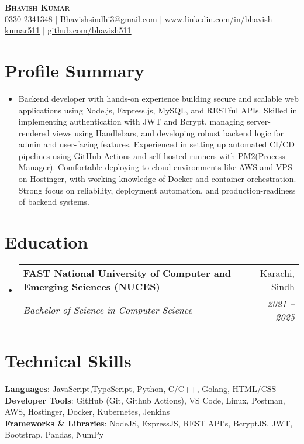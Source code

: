 \documentclass[letterpaper,10.5pt]{article}
\makeatletter
\newcommand{\resumeSubheading}[4]{
  \vspace{-2pt}\item
    \begin{tabular*}{0.97\textwidth}[t]{l@{\extracolsep{\fill}}r}
      \textbf{#1} & #2 \\
      \textit{\small#3} & \textit{\small #4} \\
    \end{tabular*}\vspace{-7pt}
}
\newcommand{\resumeSubHeadingListStart}{\begin{itemize}[leftmargin=0.15in, label={}]} %
\newcommand{\resumeSubHeadingListEnd}{\end{itemize}} %
\makeatother
\begin{document}
\begin{center}
    \textbf{\Huge \scshape Bhavish Kumar} \\ \vspace{1pt}
    \small 0330-2341348 $|$ \href{mailto:Bhavishsindhi3@gmail.com}{\underline{Bhavishsindhi3@gmail.com}} $|$ 
    \href{https://www.linkedin.com/in/bhavish-kumar511}{\underline{www.linkedin.com/in/bhavish-kumar511}} $|$
    \href{https://github.com/bhavish511}{\underline{github.com/bhavish511}}
\end{center}

\section{Profile Summary}
\resumeSubHeadingListStart
\item{
        Backend developer with hands-on experience building secure and scalable web applications using Node.js, Express.js, MySQL, and RESTful APIs. Skilled in implementing authentication with JWT and Bcrypt, managing server-rendered views using Handlebars, and developing robust backend logic for admin and user-facing features. Experienced in setting up automated CI/CD pipelines using GitHub Actions and self-hosted runners with PM2(Process Manager). Comfortable deploying to cloud environments like AWS and VPS on Hostinger, with working knowledge of Docker and container orchestration. Strong focus on reliability, deployment automation, and production-readiness of backend systems.
}
\resumeSubHeadingListEnd

\section{Education}
  \resumeSubHeadingListStart
    \resumeSubheading
      {FAST National University of Computer and Emerging Sciences (NUCES)}{Karachi, Sindh}
      {Bachelor of Science in Computer Science}{2021 -- 2025}
  \resumeSubHeadingListEnd

\section{Technical Skills}
 \begin{itemize}[leftmargin=0.15in, label={}]
    \small{\item{
     \textbf{Languages}{: JavaScript,TypeScript, Python, C/C++, Golang, HTML/CSS} \\
     \textbf{Developer Tools}{: GitHub (Git, Github Actions), VS Code, Linux, Postman, AWS, Hostinger, Docker, Kubernetes, Jenkins} \\
     \textbf{Frameworks \& Libraries}{: NodeJS, ExpressJS, REST API's, BcryptJS, JWT, Bootstrap, Pandas, NumPy} }}
 \end{itemize}
\end{document}
